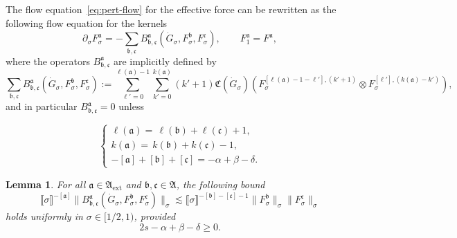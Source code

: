 \documentclass{article}
\numberwithin{equation}{section}
\newcommand{\assign}{:=}
\theoremstyle{plain}
\newtheorem{lemma}[theorem]{Lemma}
\theoremstyle{definition}
\begin{document}
The flow equation~\eqref{eq:pert-flow} for the effective force can be
rewritten as the following flow equation for the kernels
\begin{equation}
  \partial_{\sigma} F_{\sigma}^{\mathfrak{a}} = -\sum_{\mathfrak{b},
  \mathfrak{c}} B^{\mathfrak{a}}_{\mathfrak{b}, \mathfrak{c}}
  (\dot{G}_{\sigma}, F_{\sigma}^{\mathfrak{b}}, F_{\sigma}^{\mathfrak{c}}),
  \qquad F_1^{\mathfrak{a}} = F^{\mathfrak{a}}, \label{eq:flow-kernels}
\end{equation}
where the operators $B^{\mathfrak{a}}_{\mathfrak{b}, \mathfrak{c}}$ are
implicitly defined by
\begin{equation}
  \sum_{\mathfrak{b}, \mathfrak{c}} B^{\mathfrak{a}}_{\mathfrak{b},
  \mathfrak{c}} (\dot{G}_{\sigma}, F^{\mathfrak{b}}_{\sigma},
  F^{\mathfrak{c}}_{\sigma}) \assign \sum_{\ell' = 0}^{\ell (\mathfrak{a} ) -
  1} \sum^{k (\mathfrak{a})}_{k' = 0} (k' + 1) \mathfrak{C} (\dot{G}_{\sigma})
  (F^{[\ell (\mathfrak{a}) - 1 - \ell'], (k' + 1)}_{\sigma} \otimes
  F_{\sigma}^{[\ell'], (k (\mathfrak{a}) - k')}) , \label{eq:B-form}
\end{equation}
and in particular $B^{\mathfrak{a}}_{\mathfrak{b}, \mathfrak{c}} = 0$ unless


\begin{equation}
  \left\{\begin{aligned}
    \ell (\mathfrak{a} ) = \, \ell (\mathfrak{b}) + \ell (\mathfrak{c} ) +
    1,\\
    k (\mathfrak{a}) = \, k (\mathfrak{b}) + k (\mathfrak{c}) - 1,\\
    - [\mathfrak{a}] + [\mathfrak{b}] + [\mathfrak{c}] = - \alpha + \beta -
    \delta .
  \end{aligned}\right. \label{eq:link-between-homogeneities-kernels}
\end{equation}

\begin{lemma}
  \label{lem:estimate-B-kernels}For all $\mathfrak{a} \in
  \mathfrak{A}_{\mathrm{ext}}$ and $\mathfrak{b}, \mathfrak{c} \in
  \mathfrak{A}$, the following bound
  \[ \llbracket \sigma \rrbracket^{- [\mathfrak{a}]}  \|
     B^{\mathfrak{a}}_{\mathfrak{b}, \mathfrak{c}} (\dot{G}_{\sigma},
     F^{\mathfrak{b}}_{\sigma}, F^{\mathfrak{c}}_{\sigma}) \|_{\sigma}
     \lesssim \llbracket \sigma \rrbracket^{- [\mathfrak{b}] - [\mathfrak{c}]
     - 1}  \| F^{\mathfrak{b}}_{\sigma} \|_{\sigma}  \|
     F^{\mathfrak{c}}_{\sigma} \|_{\sigma} \]
  holds uniformly in $\sigma \in [1 / 2, 1)$, provided
  \begin{equation}
    2 s - \alpha + \beta - \delta \geqslant 0.
    \label{eq:constraint-flow-kernels}
  \end{equation}
\end{lemma}
\end{document}
